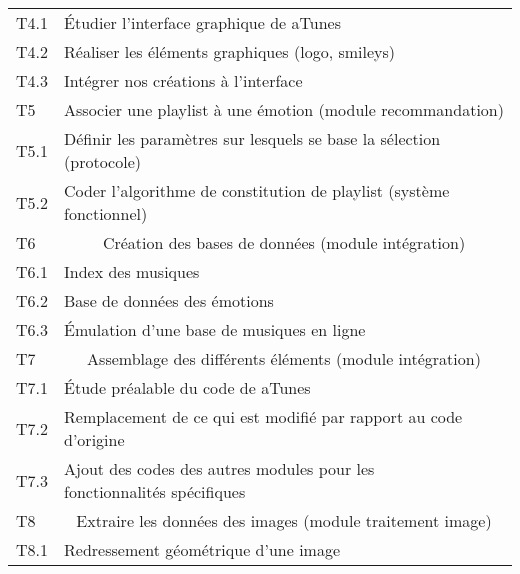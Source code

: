 \begin{tabular}{llm{1.5cm}m{1.5cm}}
	T4.1  & Étudier l'interface graphique de aTunes                                  &                      & \cs                 \\
	T4.2  & Réaliser les éléments graphiques (logo, smileys)                         &                      & \cs                 \\
	T4.3  & Intégrer nos créations à l'interface                                     &                      & \cs                 \\
	\hline
	T5    & \multicolumn{3}{c}{\cellcolor{LightSteelBlue} Associer une playlist à une émotion (module recommandation)}            \\
	T5.1  & Définir les paramètres sur lesquels se base la sélection (protocole)     &                      & \cs                 \\
	T5.2  & Coder l'algorithme de constitution de playlist (système fonctionnel)     & \cs                  &                     \\
	\hline
	T6    & \multicolumn{3}{c}{\cellcolor{LightSteelBlue} Création des bases de données (module intégration)}                     \\
	T6.1  & Index des musiques                                                       &                      & \cs                 \\
	T6.2  & Base de données des émotions                                             &                      & \cs                 \\
	T6.3  & Émulation d'une base de musiques en ligne                                & \cs                  &                     \\
	\hline
	T7    & \multicolumn{3}{c}{\cellcolor{LightSteelBlue} Assemblage des différents éléments (module intégration)}                \\
	T7.1  & Étude préalable du code de aTunes                                        &                      & \cs                 \\
	T7.2  & Remplacement de ce qui est modifié par rapport au code d'origine         &                      & \cs                 \\
	T7.3  & Ajout des codes des autres modules pour les fonctionnalités spécifiques  & \cs                  &                     \\
	\hline
	T8    & \multicolumn{3}{c}{\cellcolor{LightSteelBlue} Extraire les données des images (module traitement image)}              \\
	T8.1  & Redressement géométrique d'une image                                     &                      & \cs                 \\

\end{tabular}
